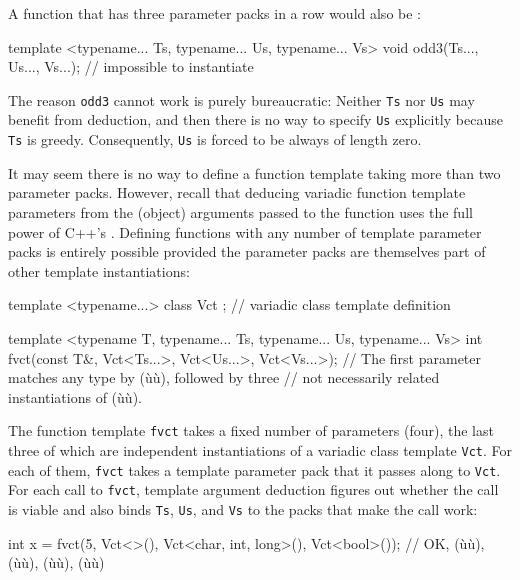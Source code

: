 A function that has three parameter packs in a row would also be
:

\begin{emcppslisting}
template <typename... Ts, typename... Us, typename... Vs>
void odd3(Ts..., Us..., Vs...);  // impossible to instantiate
\end{emcppslisting}
    

\noindent The reason \lstinline!odd3! cannot work is purely bureaucratic: Neither
\lstinline!Ts! nor \lstinline!Us! may benefit from deduction, and then there
is no way to specify \lstinline!Us! explicitly because \lstinline!Ts! is
greedy. Consequently, \lstinline!Us! is forced to be always of length zero.

It may seem there is no way to define a function template taking more
than two parameter packs. However, recall that deducing variadic
function template parameters from the (object) arguments passed to the
function uses the full power of C++'s . Defining functions with any number of template parameter
packs is entirely possible provided the parameter packs are themselves
part of other template instantiations:

\begin{emcppslisting}[emcppsbatch=e23]
template <typename...> class Vct { };  // variadic class template definition

template <typename T, typename... Ts, typename... Us, typename... Vs>
int fvct(const T&, Vct<Ts...>, Vct<Us...>, Vct<Vs...>);
    // The first parameter matches any type by (ù{}ù), followed by three
    // not necessarily related instantiations of (ù{}ù).
\end{emcppslisting}
    

\noindent The function template \lstinline!fvct! takes a fixed number of parameters
(four), the last three of which are independent instantiations of a
variadic class template \lstinline!Vct!. For each of them, \lstinline!fvct!
takes a template parameter pack that it passes along to \lstinline!Vct!.
For each call to \lstinline!fvct!, template argument deduction figures out
whether the call is viable and also binds \lstinline!Ts!, \lstinline!Us!, and
\lstinline!Vs! to the packs that make the call work:

\begin{emcppslisting}[emcppsbatch=e23]
int x = fvct(5, Vct<>(), Vct<char, int, long>(), Vct<bool>());
    // OK, (ù{}ù), (ù{}ù), (ù{}ù), (ù{}ù)
\end{emcppslisting}
    

